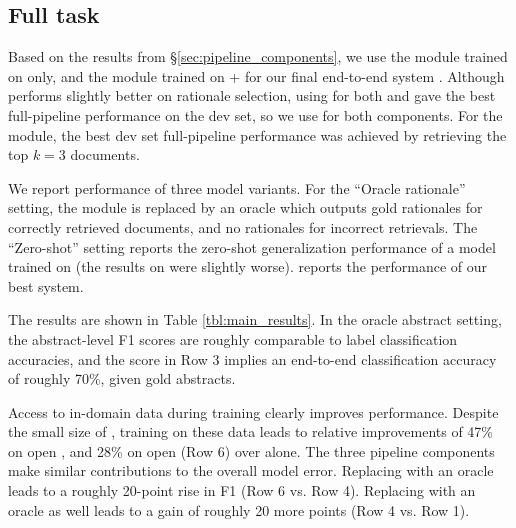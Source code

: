 \subsection{Full task} \label{sec:main_results}
Based on the results from \S\ref{sec:pipeline_components}, we use the \componenttwo module trained on \ours only, and the \componentthree module trained on \fever + \ours for our final end-to-end system \sysname. Although \scibert performs slightly better on rationale selection, using \robertalarge for both \componenttwo and \componentthree gave the best full-pipeline performance on the dev set, so we use \robertalarge for both components. For the \componentone module, the best dev set full-pipeline performance was achieved by retrieving the top $k=3$ documents. %

\vspace{.2cm}
We report performance of three model variants. For the ``Oracle rationale'' setting, the \componenttwo module is replaced by an oracle which outputs gold rationales for correctly retrieved documents, and no rationales for incorrect retrievals. The ``Zero-shot'' setting reports the zero-shot generalization performance of a model trained on \fever (the results on \snopes were slightly worse). \sysname reports the performance of our best system.


\vspace{.2cm}
The results are shown in Table \ref{tbl:main_results}. In the oracle abstract setting, the abstract-level F1 scores are roughly comparable to label classification accuracies, %
and the \abstractLabelRationale score in Row 3 implies an end-to-end classification accuracy of roughly 70\%, given gold abstracts.

Access to in-domain data during training clearly improves performance. Despite the small size of \ours, training on these data leads to relative improvements of 47\% on open \sentenceSelectionLabel, and 28\% on open \abstractLabelRationale (Row 6) over \fever alone.
%
The three pipeline components make similar contributions to the overall model error. Replacing \componenttwo with an oracle leads to a roughly 20-point rise in \sentenceSelectionLabel F1 (Row 6 vs. Row 4). Replacing \componentone with an oracle as well leads to a gain of roughly 20 more points (Row 4 vs. Row 1).

